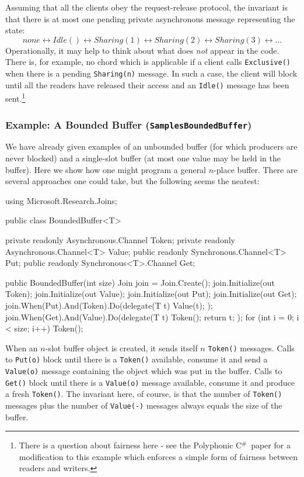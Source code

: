 \documentclass{article}
\newcommand{\csharp}{\texorpdfstring{\mbox{C$^\#$}}{C\#}}
\newcommand{\sample}[1]{\texorpdfstring{{(\texttt{Samples{\symbol{92}}#1})}}{}}
\begin{document}
Assuming that all the clients obey the request-release protocol, the
invariant is that there is at most one pending private asynchronous message
representing the state:
\[
      none \leftrightarrow Idle() \leftrightarrow Sharing(1) 
\leftrightarrow Sharing(2) \leftrightarrow Sharing(3) \leftrightarrow\ldots
\]
Operationally, it may help to think about what does \emph{not} appear in the
code. There is, for example, no chord which is applicable if a client
calls \verb|Exclusive()| when there is a pending \verb|Sharing(n)| message. In such a
case, the client will block until all the readers have released their
access and an \verb|Idle()| message has been sent.\footnote{There is a question about
fairness here - see the Polyphonic \csharp\ paper \cite{polyphony-toplas} for a modification
to this example which enforces a simple form of fairness between
readers and writers.}

\subsubsection{Example: A Bounded Buffer \sample{BoundedBuffer}}

We have already given examples of an unbounded buffer
(for which producers are never blocked) and a single-slot buffer (at
most one value may be held in the buffer). Here we show how one might
program a general $n$-place buffer. There are several
approaches one could take, but the following seems the neatest:
\begin{lstcsharp}
  using Microsoft.Research.Joins;

  public class BoundedBuffer<T> {
    private readonly Asynchronous.Channel Token;
    private readonly Asynchronous.Channel<T> Value;
    public readonly Synchronous.Channel<T> Put;
    public readonly Synchronous<T>.Channel Get;

    public BoundedBuffer(int size) {
      Join join = Join.Create();
      join.Initialize(out Token);
      join.Initialize(out Value);
      join.Initialize(out Put);
      join.Initialize(out Get);
      join.When(Put).And(Token).Do(delegate(T t)
      {
        Value(t);
      });
      join.When(Get).And(Value).Do(delegate(T t)
      {
        Token();
        return t;
      });
      for (int i = 0; i < size; i++) {
        Token();
      }
    }
  }
\end{lstcsharp}

When an $n$-slot buffer object is created, it sends itself $n$
\verb|Token()| messages. Calls to \verb|Put(o)| block until there is a
\verb|Token()| available, consume it and send a \verb|Value(o)| message
containing the object which was put in the buffer. Calls to
\verb|Get()| block until there is a \verb|Value(o)| message available,
consume it and produce a fresh \verb|Token()|. The invariant here, of
course, is that the number of \verb|Token()| messages plus the number
of \verb|Value(-)| messages always equals the size of the buffer.
\end{document}
